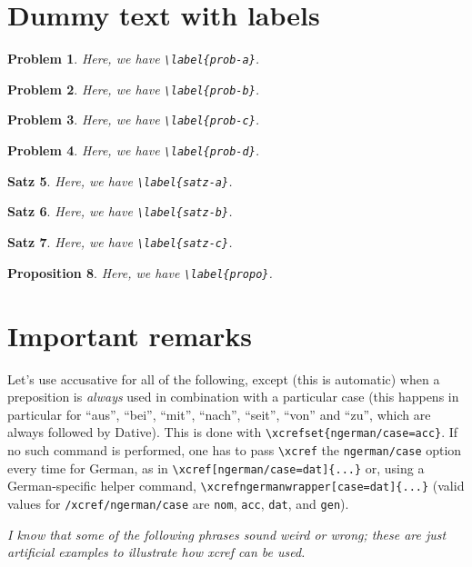 \documentclass[ngerman]{article}
\newtheorem{problem}{Problem}
\newtheorem{satz}[problem]{Satz}
\newtheorem{proposition}[problem]{Proposition}
\begin{document}
\section{Dummy text with labels}
\label{sec-dummy-text-with-labels}

\begin{problem}\label{prob-a}
Here, we have \verb|\label{prob-a}|.
\end{problem}
\begin{problem}\label{prob-b}
Here, we have \verb|\label{prob-b}|.
\end{problem}
\begin{problem}\label{prob-c}
Here, we have \verb|\label{prob-c}|.
\end{problem}
\begin{problem}\label{prob-d}
Here, we have \verb|\label{prob-d}|.
\end{problem}
\begin{satz}\label{satz-a}
Here, we have \verb|\label{satz-a}|.
\end{satz}
\begin{satz}\label{satz-b}
Here, we have \verb|\label{satz-b}|.
\end{satz}
\begin{satz}\label{satz-c}
Here, we have \verb|\label{satz-c}|.
\end{satz}
\begin{proposition}\label{propo}
Here, we have \verb|\label{propo}|.
\end{proposition}

\section{Important remarks}

Let's use accusative for all of the following, except (this is automatic) when
a preposition is \emph{always} used in combination with a particular case
(this happens in particular for “aus”, “bei”, “mit”, “nach”, “seit”, “von” and
“zu”, which are always followed by Dative). This is done with
\verb|\xcrefset{ngerman/case=acc}|. If no such command is performed, one has
to pass \verb|\xcref| the \verb|ngerman/case| option every time for German, as
in \verb|\xcref[ngerman/case=dat]{...}| or, using a German-specific helper
command, \verb|\xcrefngermanwrapper[case=dat]{...}| (valid values for
\texttt{/xcref/ngerman/case} are \verb|nom|, \verb|acc|, \verb|dat|, and
\verb|gen|).

\emph{I know that some of the following phrases sound weird or wrong; these
  are just artificial examples to illustrate how \textsf{xcref} can be used.}
\end{document}
